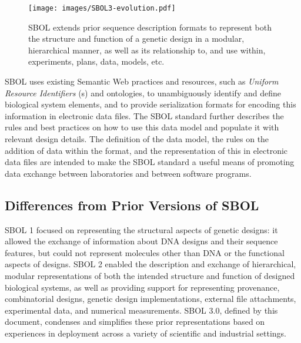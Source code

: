 \begin{figure}[htbp!]
\centering
\texttt{[image: images/SBOL3-evolution.pdf]}
\caption{SBOL extends prior sequence description formats to represent both the structure and function of a genetic design in a modular, hierarchical manner, as well as its relationship to, and use within, experiments, plans, data, models, etc.}
\label{f:sequence}
\end{figure}

SBOL uses existing Semantic Web practices and resources, such as \emph{Uniform Resource Identifiers} (s) and ontologies, to unambiguously identify and define biological system elements,
and to provide serialization formats for encoding this information in electronic data files.
The SBOL standard further describes the rules and best practices on how to use this data model and populate it with relevant design details.
The definition of the data model, the rules on the addition of data within the format, and the representation of this in electronic data files are intended to make the SBOL standard a useful means of promoting data exchange between laboratories and between software programs.

\subsection*{Differences from Prior Versions of SBOL}

SBOL 1 focused on representing the structural aspects of genetic designs: it allowed the exchange of information about DNA designs and their sequence features, but could not represent molecules other than DNA or the functional aspects of designs. SBOL 2 enabled the description and exchange of hierarchical, modular representations of both the intended structure and function of designed biological systems, as well as providing support for representing provenance, combinatorial designs, genetic design implementations, external file attachments, experimental data, and numerical measurements.
SBOL 3.0, defined by this document, condenses and simplifies these prior representations based on experiences in deployment across a variety of scientific and industrial settings.


